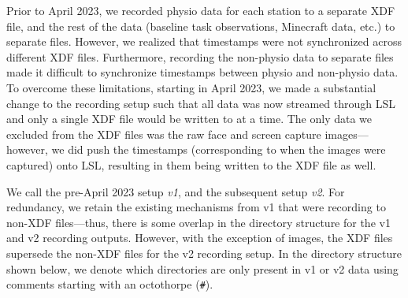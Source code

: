 
Prior to April 2023, we recorded physio data for each station to a separate
XDF file, and the rest of the data (baseline task observations, Minecraft data,
etc.) to separate files. However, we realized that timestamps were not
synchronized across different XDF files. Furthermore, recording the non-physio
data to separate files made it difficult to synchronize timestamps between
physio and non-physio data. To overcome these limitations, starting in April
2023, we made a substantial change to the recording setup such that all data
was now streamed through LSL and only a single XDF file would be written to at
a time. The only data we excluded from the XDF files was the raw face and screen
capture images---however, we did push the timestamps (corresponding to when the
images were captured) onto LSL, resulting in them being written to the XDF file
as well.

We call the pre-April 2023 setup \emph{v1}, and the subsequent setup \emph{v2}.
For redundancy, we retain the existing mechanisms from v1 that were
recording to non-XDF files---thus, there is some overlap in the directory
structure for the v1 and v2 recording outputs. However, with the exception of
images, the XDF files supersede the non-XDF files for the v2 recording setup.
In the directory structure shown below, we denote which directories are only
present in v1 or v2 data using comments starting with an octothorpe (\verb|#|).

